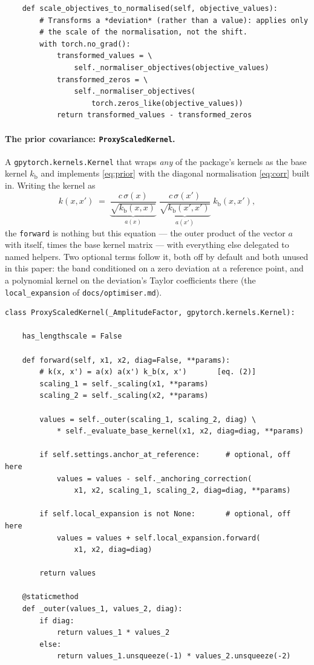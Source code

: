 \documentclass[11pt,a4paper]{article}
\newcommand{\code}[1]{\texttt{#1}}
\begin{document}
\begin{lstlisting}
    def scale_objectives_to_normalised(self, objective_values):
        # Transforms a *deviation* (rather than a value): applies only
        # the scale of the normalisation, not the shift.
        with torch.no_grad():
            transformed_values = \
                self._normaliser_objectives(objective_values)
            transformed_zeros = \
                self._normaliser_objectives(
                    torch.zeros_like(objective_values))
            return transformed_values - transformed_zeros
\end{lstlisting}

\paragraph{The prior covariance: \code{ProxyScaledKernel}.} A
\code{gpytorch.kernels.\allowbreak{}Kernel} that wraps \emph{any} of the package's
kernels as the base kernel $k_{\mathrm{b}}$ and implements \eqref{eq:prior}
with the diagonal normalisation \eqref{eq:corr} built in. Writing the kernel
as
\begin{equation*}
  k(x, x') \;=\;
  \underbrace{\frac{c\,\sigma(x)}{\sqrt{k_{\mathrm{b}}(x,x)}}}_{a(x)}
  \;
  \underbrace{\frac{c\,\sigma(x')}{\sqrt{k_{\mathrm{b}}(x',x')}}}_{a(x')}
  \; k_{\mathrm{b}}(x, x'),
\end{equation*}
the \code{forward} is nothing but this equation --- the outer product of the
vector $a$ with itself, times the base kernel matrix --- with everything else
delegated to named helpers. Two optional terms follow it, both off by
default and both unused in this paper: the band conditioned on a zero
deviation at a reference point, and a polynomial kernel on the deviation's
Taylor coefficients there (the \code{local\_expansion} of
\code{docs/optimiser.md}).

\begin{lstlisting}
class ProxyScaledKernel(_AmplitudeFactor, gpytorch.kernels.Kernel):

    has_lengthscale = False

    def forward(self, x1, x2, diag=False, **params):
        # k(x, x') = a(x) a(x') k_b(x, x')       [eq. (2)]
        scaling_1 = self._scaling(x1, **params)
        scaling_2 = self._scaling(x2, **params)

        values = self._outer(scaling_1, scaling_2, diag) \
            * self._evaluate_base_kernel(x1, x2, diag=diag, **params)

        if self.settings.anchor_at_reference:      # optional, off here
            values = values - self._anchoring_correction(
                x1, x2, scaling_1, scaling_2, diag=diag, **params)

        if self.local_expansion is not None:       # optional, off here
            values = values + self.local_expansion.forward(
                x1, x2, diag=diag)

        return values

    @staticmethod
    def _outer(values_1, values_2, diag):
        if diag:
            return values_1 * values_2
        else:
            return values_1.unsqueeze(-1) * values_2.unsqueeze(-2)
\end{lstlisting}
\end{document}
